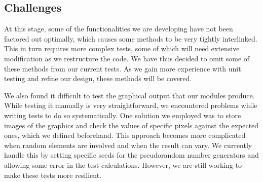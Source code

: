 \documentclass[12pt]{article}
\begin{document}
\subsection{Challenges}
At this stage, some of the functionalities we are developing have not been factored out optimally, which causes some methods to be very tightly interlinked. This in turn requires more complex tests, some of which will need extensive modification as we restructure the code. We have thus decided to omit some of these methods from our current tests. As we gain more experience with unit testing and refine our design, these methods will be covered.

We also found it difficult to test the graphical output that our modules produce. While testing it manually is very straightforward, we encountered problems while writing tests to do so systematically. One solution we employed was to store images of the graphics and check the values of specific pixels against the expected ones, which we defined beforehand. This approach becomes more complicated when random elements are involved and when the result can vary. We currently handle this by setting specific seeds for the pseudorandom number generators and allowing some error in the test calculations. However, we are still working to make these tests more resilient.
\end{document}
